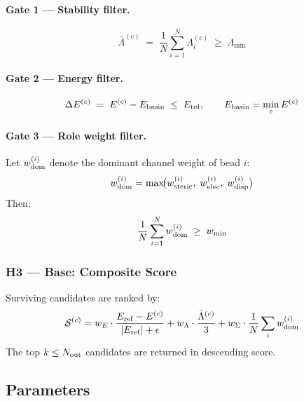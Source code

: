\documentclass[11pt, a4paper, oneside]{article}
\theoremstyle{definition}
\begin{document}
\paragraph{Gate 1 — Stability filter.}
%
\begin{equation}
  \bar{\Lambda}^{(c)} \;=\;
  \frac{1}{N} \sum_{i=1}^N \Lambda_i^{(c)}
  \;\geq\; \Lambda_{\min}
  \label{eq:gate1}
\end{equation}

\paragraph{Gate 2 — Energy filter.}
%
\begin{equation}
  \Delta E^{(c)} \;=\; E^{(c)} - E_{\rm basin} \;\leq\; E_{\rm tol},
  \qquad
  E_{\rm basin} = \min_c E^{(c)}
  \label{eq:gate2}
\end{equation}

\paragraph{Gate 3 — Role weight filter.}

Let $w_{\rm dom}^{(i)}$ denote the dominant channel weight of bead $i$:
%
\begin{equation}
  w_{\rm dom}^{(i)} = \max\!\bigl(w_{\rm steric}^{(i)},\;
                                   w_{\rm elec}^{(i)},\;
                                   w_{\rm disp}^{(i)}\bigr)
\end{equation}
%
Then:
%
\begin{equation}
  \frac{1}{N}\sum_{i=1}^N w_{\rm dom}^{(i)} \;\geq\; w_{\rm min}
  \label{eq:gate3}
\end{equation}

\subsubsection{H3 — Base: Composite Score}

Surviving candidates are ranked by:
%
\begin{equation}
  \mathcal{S}^{(c)} =
    w_E \cdot \frac{E_{\rm ref} - E^{(c)}}{|E_{\rm ref}| + \epsilon}
  + w_\Lambda \cdot \frac{\bar\Lambda^{(c)}}{3}
  + w_\Sigma \cdot \frac{1}{N}\sum_i w_{\rm dom}^{(i)}
  \label{eq:hg-score}
\end{equation}
%
The top $k \leq N_{\rm out}$ candidates are returned in descending score.

\subsection{Parameters}
\end{document}
